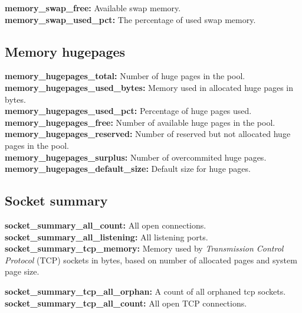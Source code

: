 \documentclass{iosart2c}
\begin{document}
\textbf{memory\_swap\_free:} Available swap memory.\\

\textbf{memory\_swap\_used\_pct:} The percentage of used swap memory.\\


\subsection{Memory hugepages}

\textbf{memory\_hugepages\_total:} Number of huge pages in the pool.\\

\textbf{memory\_hugepages\_used\_bytes:} Memory used in allocated huge pages in bytes.\\

\textbf{memory\_hugepages\_used\_pct:} Percentage of huge pages used.\\

\textbf{memory\_hugepages\_free:} Number of available huge pages in the pool.\\

\textbf{memory\_hugepages\_reserved:} Number of reserved but not allocated huge pages in the pool.\\

\textbf{memory\_hugepages\_surplus:} Number of overcommited huge pages.\\

\textbf{memory\_hugepages\_default\_size:} Default size for huge pages.




\subsection{Socket summary}

\textbf{socket\_summary\_all\_count:} All open connections.\\

\textbf{socket\_summary\_all\_listening:} All listening ports.\\

\textbf{socket\_summary\_tcp\_memory:} Memory used by  \textit{Transmission Control Protocol} (TCP) sockets in bytes, based on number of allocated pages and system page size.

\textbf{socket\_summary\_tcp\_all\_orphan:} A count of all orphaned tcp sockets.\\

\textbf{socket\_summary\_tcp\_all\_count:} All open TCP connections.\\
\end{document}
